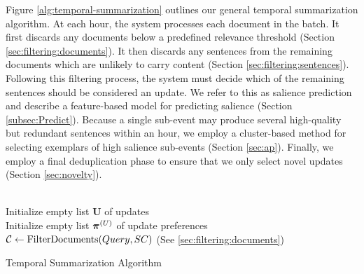
Figure \ref{alg:temporal-summarization} outlines our general temporal
summarization algorithm.  At each hour, the system processes each document in
the batch. It first discards any documents below a predefined relevance
threshold (Section \ref{sec:filtering:documents}).  It then discards any
sentences from the remaining documents which are unlikely to carry content
(Section \ref{sec:filtering:sentences}).  Following this filtering process, the
system must decide which of the remaining sentences should be considered an
update.  We refer to this as salience prediction and describe a feature-based
model for predicting salience (Section \ref{subsec:Predict}).  Because a single
sub-event may produce several high-quality but redundant sentences within an hour, we employ a cluster-based method for selecting exemplars of high salience sub-events (Section \ref{sec:ap}).  Finally, we employ a final deduplication phase to ensure that we only select novel updates (Section \ref{sec:novelty}).

\begin{algorithm}%
 ~\\
 Initialize empty list $\mathbf{U}$ of updates\\
 Initialize empty list $\boldsymbol{\operatorname{\boldsymbol{\pi}}}^{(U)}$ of update preferences\\
 $\operatorname{\mathcal{C}} \gets \operatorname{FilterDocuments}(Query, SC)$ (See \cref{sec:filtering:documents})\\
 \caption{Temporal Summarization Algorithm}\label{alg:temporal-summarization}
\end{algorithm}
